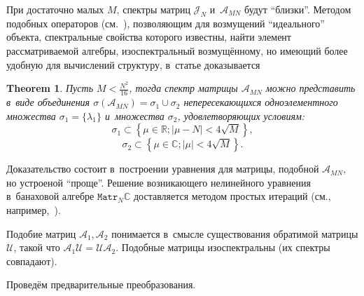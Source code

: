\documentclass[a4paper]{article}
\newtheorem{thm}{Theorem}
\theoremstyle{definition}
\begin{document}
При достаточно малых \( M \),
 спектры матриц \( \mathcal{J}_N \) и~\( \mathscr{A}_{MN} \) будут ``близки''.
Методом подобных операторов (см.~\cite{baskakov-harmonic,baskakov-split}),
 позволяющим для возмущений ``идеального'' объекта, спектральные свойства которого известны,
 найти элемент рассматриваемой алгебры, изоспектральный возмущ\"енному,
 но имеющий более удобную для вычислений структуру,
 в~статье доказывается
\begin{thm}\label{kozlukovsv:thm:almost-all-ones}
    Пусть \( M < \frac{N^2}{16} \),
    тогда спектр матрицы \( \mathscr{A}_{MN} \) можно представить в~виде
    объединения \( \sigma\left(\mathscr{A}_{MN}\right) = \sigma_1 \cup \sigma_2 \)
    непересекающихся
    одноэлементного множества \( \sigma_1=\{\lambda_1\} \)
    и~множества \( \sigma_2 \), удовлетворяющих условиям:
    \[ \sigma_1 \subset \left\{ \mu\in\mathbb{R}; \lvert \mu - N \rvert < 4\sqrt{M} \right\}, \]
    \[ \sigma_2 \subset \left\{ \mu\in\mathbb{C}; \lvert \mu \rvert < 4\sqrt{M} \right\}. \]
\end{thm}

Доказательство состоит в~построении уравнения для матрицы, подобной \( \mathscr{A}_{MN} \),
 но устроеной ``проще''. Решение возникающего нелинейного уравнения
 в~банаховой алгебре \( \mathtt{Matr}_N\mathbb{C} \)
 доставляется методом простых итераций (см., например,~\cite{baskakov-harmonic}).

Подобие матриц \( \mathcal{A}_1, \mathcal{A}_2 \)
 понимается в~смысле существования обратимой матрицы \( \mathcal{U} \),
 такой что \( \mathcal{A}_1 \mathcal{U} = \mathcal{U} \mathcal{A}_2 \).
Подобные матрицы изоспектральны (их спектры совпадают).

Провед\"ем предварительные преобразования.
\end{document}

